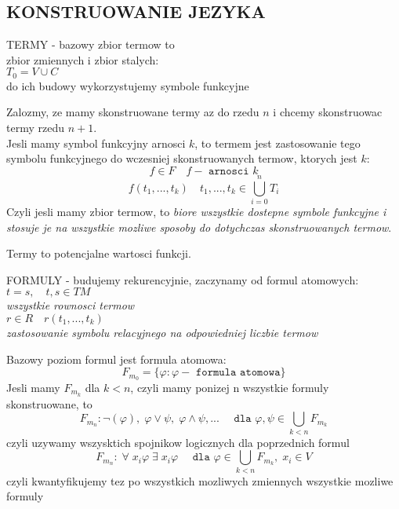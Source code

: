 \documentclass{article}
\begin{document}
\subsection*{\color{tit}KONSTRUOWANIE JEZYKA}
  \begin{center}
    \color{def}TERMY \color{txt}- bazowy zbior termow to \\
    zbior zmiennych i zbior stalych:\\
    $T_0=V\cup C$\\
    do ich budowy wykorzystujemy symbole funkcyjne
  \end{center}
  Zalozmy, ze mamy skonstruowane termy az do rzedu $n$ i chcemy skonstruowac termy rzedu $n+1$. \\Jesli mamy symbol funkcyjny arnosci $k$, to \color{emp}termem jest zastosowanie tego symbolu funkcyjnego do wczesniej skonstruowanych termow\color{txt}, ktorych jest $k$:
  $$f\in F\quad f -\texttt{ arnosci }k$$
  $$f(t_1, ..., t_k)\quad t_1, ..., t_k \in \bigcup\limits^n_{i=0}T_i$$
  Czyli jesli mamy zbior termow, to \color{emp}\emph{biore wszystkie dostepne symbole funkcyjne i stosuje je na wszystkie mozliwe sposoby do dotychczas skonstruowanych termow}\color{txt}.\smallskip
  \begin{center}\color{def}Termy to potencjalne wartosci funkcji\color{txt}.\end{center}
  \begin{center}\color{def}FORMULY \color{txt}- budujemy rekurencyjnie, zaczynamy od \color{acc}formul atomowych\color{txt}:\smallskip\\
    $t = s, \quad t,s\in TM$ \\\emph{wszystkie rownosci termow}\smallskip\\
    $r \in R\quad r(t_1, ..., t_k)$ \\\emph{zastosowanie symbolu relacyjnego na odpowiedniej liczbie termow}
  \end{center}
  Bazowy poziom formul jest formula atomowa:
  $$F_{m_0}=\{\varphi:\varphi - \texttt{ formula atomowa}\}$$
  Jesli mamy $F_{m_k}$ dla $k<n$, czyli mamy ponizej n wszystkie formuly skonstruowane, to
    $$F_{m_n}:\neg(\varphi), \;\varphi\lor\psi,\;\varphi\land\psi,...\quad\texttt{ dla }\varphi,\psi\in\bigcup\limits_{k<n}F_{m_k}$$
    czyli \color{emp}uzywamy wszysktich spojnikow logicznych \color{txt}dla poprzednich formul
    $$F_{m_n}:\;\forall\;x_i\varphi\;\exists\; x_i\varphi\quad\texttt{ dla }\varphi\in\bigcup\limits_{k<n}F_{m_k}, \;x_i\in V$$
    czyli \color{emp}kwantyfikujemy tez po wszystkich mozliwych zmiennych wszystkie mozliwe formuly\color{txt}
\end{document}
